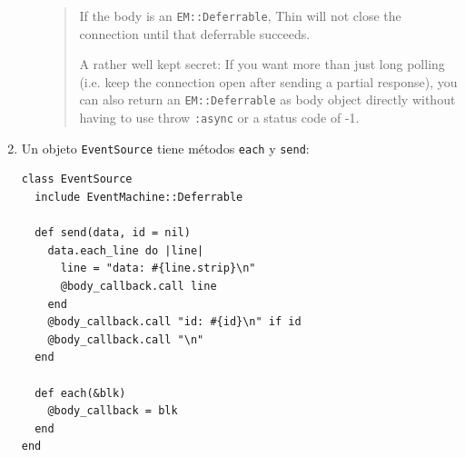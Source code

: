 \begin{enumerate}
\begin{enumerate}
\begin{quote}
If the body is an \verb|EM::Deferrable|, Thin will not close the
connection until that deferrable succeeds. 

A rather well kept secret:
If you want more than just long polling (i.e. keep the connection
open after sending a partial response), you can also return an
\verb|EM::Deferrable| as body object directly without having to use throw
\verb|:async| or a status code of -1.
\end{quote}

\end{enumerate}
\item 
Un objeto \verb|EventSource| tiene métodos \verb|each| y \verb|send|:
\label{item:eventsource}
\begin{verbatim}
class EventSource
  include EventMachine::Deferrable

  def send(data, id = nil)
    data.each_line do |line|
      line = "data: #{line.strip}\n"
      @body_callback.call line
    end
    @body_callback.call "id: #{id}\n" if id
    @body_callback.call "\n"
  end

  def each(&blk)
    @body_callback = blk
  end
end
\end{verbatim}
\end{enumerate}



